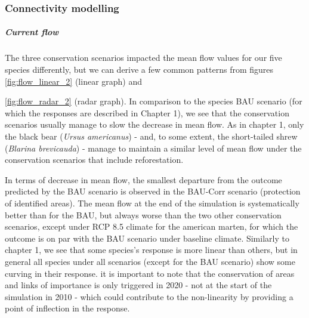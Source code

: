 \subsubsection{Connectivity modelling}

\vspace{1em}

\subparagraph*{\textit{Current flow}} The three conservation scenarios impacted the mean flow values for our five species differently, but we can derive a few common patterns from figures \ref{fig:flow_linear_2} (linear graph) and {\ref{fig:flow_radar_2} (radar graph). In comparison to the species BAU scenario (for which the responses are described in Chapter 1), we see that the conservation scenarios usually manage to slow the decrease in mean flow. As in chapter 1, only the black bear (\textit{Ursus americanus}) - and, to some extent, the short-tailed shrew (\textit{Blarina brevicauda}) - manage to maintain a similar level of mean flow under the conservation scenarios that include reforestation.

In terms of decrease in mean flow, the smallest departure from the outcome predicted by the BAU scenario is observed in the BAU-Corr scenario (protection of identified areas). The mean flow at the end of the simulation is systematically better than for the BAU, but always worse than the two other conservation scenarios, except under RCP 8.5 climate for the american marten, for which the outcome is on par with the BAU scenario under baseline climate.  Similarly to chapter 1, we see that some species's response is more linear than others, but in general all species under all scenarios (except for the BAU scenario) show some curving in their response. it is important to note that the conservation of areas and links of importance is only triggered in 2020  - not at the start of the simulation in 2010 - which could contribute to the non-linearity by providing a point of inflection in the response.

}
